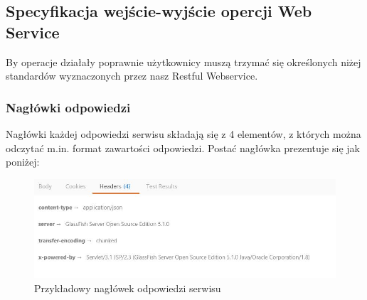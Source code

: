 \documentclass[11pt]{article}   %
\begin{document}
\subsection{Specyfikacja wejście-wyjście opercji Web Service}
By operacje działały poprawnie użytkownicy muszą trzymać się określonych niżej standardów wyznaczonych przez nasz Restful Webservice.
\subsubsection{Nagłówki odpowiedzi}
Nagłówki każdej odpowiedzi serwisu składają się z 4 elementów, z których można odczytać m.in. format zawartości odpowiedzi. Postać nagłówka prezentuje się jak poniżej:
\begin{figure}[H]
	\centering
	\includegraphics[width=0.8\linewidth]{komunikaty_zdjecia_rest/getMagazyn_res_head}
	\caption{Przykładowy nagłówek odpowiedzi serwisu}
	\label{zrzut1}
\end{figure}
\end{document}
